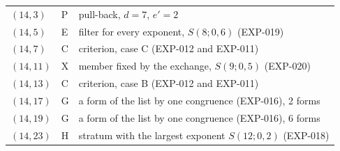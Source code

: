\begin{tabular}{@{}ll>{\raggedright\arraybackslash}p{9.8cm}@{}}
$(14,3)$ & P & pull-back, $d=7$, $e'=2$\\
$(14,5)$ & E & filter for every exponent, $S(8;0,6)$ (EXP-019)\\
$(14,7)$ & C & criterion, case C (EXP-012 and EXP-011)\\
$(14,11)$ & X & member fixed by the exchange, $S(9;0,5)$ (EXP-020)\\
$(14,13)$ & C & criterion, case B (EXP-012 and EXP-011)\\
$(14,17)$ & G & a form of the list by one congruence (EXP-016), 2 forms\\
$(14,19)$ & G & a form of the list by one congruence (EXP-016), 6 forms\\
$(14,23)$ & H & stratum with the largest exponent $S(12;0,2)$ (EXP-018)\\
\bottomrule
\end{tabular}
